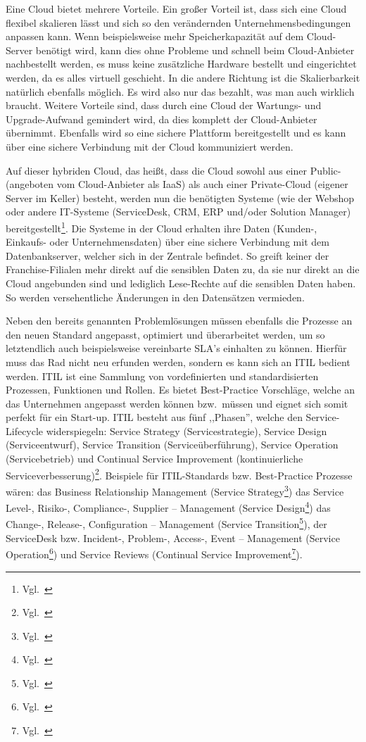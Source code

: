 Eine Cloud bietet mehrere Vorteile. Ein großer Vorteil ist, dass sich
eine Cloud flexibel skalieren lässt und sich so den verändernden
Unternehmensbedingungen anpassen kann. Wenn beispielsweise mehr
Speicherkapazität auf dem Cloud-Server benötigt wird, kann dies ohne
Probleme und schnell beim Cloud-Anbieter nachbestellt werden, es muss
keine zusätzliche Hardware bestellt und eingerichtet werden, da es
alles virtuell geschieht. In die andere Richtung ist die
Skalierbarkeit natürlich ebenfalls möglich. Es wird also nur das
bezahlt, was man auch wirklich braucht. Weitere Vorteile sind, dass
durch eine Cloud der Wartungs- und Upgrade-Aufwand gemindert wird, da
dies komplett der Cloud-Anbieter übernimmt. Ebenfalls wird so eine
sichere Plattform bereitgestellt und es kann über eine sichere
Verbindung mit der Cloud kommuniziert werden.

Auf dieser hybriden Cloud, das heißt, dass die Cloud sowohl aus einer
Public- (angeboten vom Cloud-Anbieter als \acrshort{IaaS}) als auch einer
Private-Cloud (eigener Server im Keller) besteht, werden nun die
benötigten Systeme (wie der Webshop oder andere IT-Systeme
(ServiceDesk, CRM, ERP und/oder Solution Manager)
bereitgestellt\footnote{Vgl.~\cite{Hybrid-Cloud}}. Die Systeme in der
Cloud erhalten ihre Daten (Kunden-, Einkaufs- oder Unternehmensdaten)
über eine sichere Verbindung mit dem Datenbankserver, welcher sich in
der Zentrale befindet. So greift keiner der Franchise-Filialen mehr
direkt auf die sensiblen Daten zu, da sie nur direkt an die Cloud
angebunden sind und lediglich Lese-Rechte auf die sensiblen Daten
haben. So werden versehentliche Änderungen in den Datensätzen
vermieden.

Neben den bereits genannten Problemlösungen müssen ebenfalls die
Prozesse an den neuen Standard angepasst, optimiert und überarbeitet
werden, um so letztendlich auch beispielsweise vereinbarte \acrshort{SLA}’s
einhalten zu können. Hierfür muss das Rad nicht neu erfunden werden,
sondern es kann sich an ITIL bedient werden. ITIL ist eine Sammlung
von vordefinierten und standardisierten Prozessen, Funktionen und
Rollen. Es bietet Best-Practice Vorschläge, welche an das Unternehmen
angepasst werden können bzw.~müssen und eignet sich somit perfekt für
ein Start-up. ITIL besteht aus fünf ,,Phasen'', welche den
Service-Lifecycle widerspiegeln: Service Strategy (Servicestrategie),
Service Design (Serviceentwurf), Service Transition
(Serviceüberführung), Service Operation (Servicebetrieb) und Continual
Service Improvement (kontinuierliche
Serviceverbesserung)\footnote{Vgl.~\cite{ITIL-Prozesse}}. Beispiele
für ITIL-Standards bzw. Best-Practice Prozesse wären: das Business
Relationship Management (Service
Strategy\footnote{Vgl.~\cite{ITIL-Service-Strategy}}) das Service
Level-, Risiko-, Compliance-, Supplier – Management (Service
Design\footnote{Vgl.~\cite{ITIL-Service-Design}}) das Change-,
Release-, Configuration – Management (Service
Transition\footnote{Vgl.~\cite{ITIL-Service-Transition}}), der
ServiceDesk bzw. Incident-, Problem-, Access-, Event – Management
(Service Operation\footnote{Vgl.~\cite{ITIL-Service-Operation}}) und
Service Reviews (Continual Service
Improvement\footnote{Vgl.~\cite{ITIL-CSI}}).

